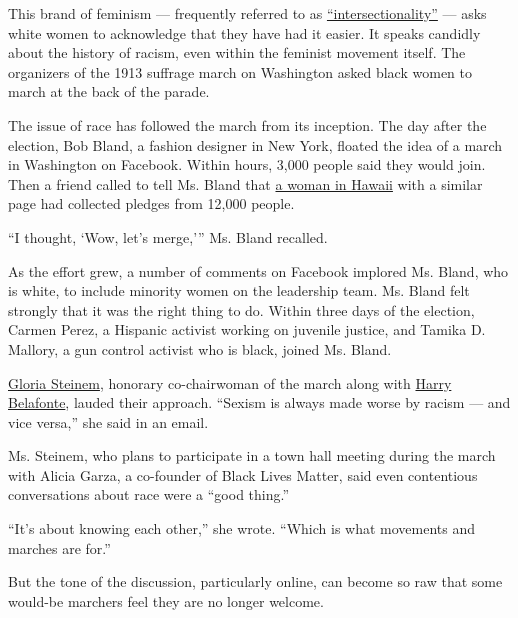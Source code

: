 This brand of feminism --- frequently referred to as
\href{https://www.washingtonpost.com/news/in-theory/wp/2015/09/24/why-intersectionality-cant-wait/?utm_term=.57d0384a6d96}{``intersectionality''}
--- asks white women to acknowledge that they have had it easier. It
speaks candidly about the history of racism, even within the feminist
movement itself. The organizers of the 1913 suffrage march on Washington
asked black women to march at the back of the parade.

The issue of race has followed the march from its inception. The day
after the election, Bob Bland, a fashion designer in New York, floated
the idea of a march in Washington on Facebook. Within hours, 3,000
people said they would join. Then a friend called to tell Ms. Bland that
\href{https://www.washingtonpost.com/national/it-started-with-a-grandmother-in-hawaii-now-the-womens-march-on-washington-is-poised-to-be-the-biggest-inauguration-demonstration/2017/01/03/8af61686-c6e2-11e6-bf4b-2c064d32a4bf_story.html?utm_term=.3aa2a18a7aab}{a
woman in Hawaii} with a similar page had collected pledges from 12,000
people.

``I thought, `Wow, let's merge,''' Ms. Bland recalled.

As the effort grew, a number of comments on Facebook implored Ms. Bland,
who is white, to include minority women on the leadership team. Ms.
Bland felt strongly that it was the right thing to do. Within three days
of the election, Carmen Perez, a Hispanic activist working on juvenile
justice, and Tamika D. Mallory, a gun control activist who is black,
joined Ms. Bland.

\href{https://www.nytimes.com/topic/person/gloria-steinem}{Gloria
Steinem}, honorary co-chairwoman of the march along with
\href{https://www.nytimes.com/2016/11/07/opinion/campaign-stops/harry-belafonte-what-do-we-have-to-lose-everything.html}{Harry
Belafonte}, lauded their approach. ``Sexism is always made worse by
racism --- and vice versa,'' she said in an email.

Ms. Steinem, who plans to participate in a town hall meeting during the
march with Alicia Garza, a co-founder of Black Lives Matter, said even
contentious conversations about race were a ``good thing.''

``It's about knowing each other,'' she wrote. ``Which is what movements
and marches are for.''

But the tone of the discussion, particularly online, can become so raw
that some would-be marchers feel they are no longer welcome.

